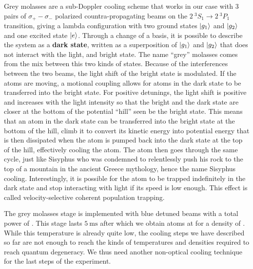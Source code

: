 Grey molasses are a sub-Doppler cooling scheme that works in our case with 3 pairs of $\sigma_{+} - \sigma_{-}$ polarized countra-propagating beams on the $2 \ ^3 S_1 \rightarrow 2 \ ^3 P_1$ transition, giving a lambda configuration with two ground states $\ket{g_1}$ and $\ket{g_2}$ and one excited state $\ket{e}$. Through a change of a basis, it is possible to describe the system as a \textbf{dark state}, written as a superposition of $\ket{g_1}$ and $\ket{g_2}$ that does not interact with the light, and bright state. The name ``grey'' molasses comes from the mix between this two kinds of states. Because of the interferences between the two beams, the light shift of the bright state is modulated. If the atoms are moving, a motional coupling allows for atoms in the dark state to be transferred into the bright state. For positive detunings, the light shift is positive and increases with the light intensity so that the bright and the dark state are closer at the bottom of the potential ``hill'' seen be the bright state. This means that an atom in the dark state can be transferred into the bright state at the bottom of the hill, climb it to convert its kinetic energy into potential energy that is then dissipated when the atom is pumped back into the dark state at the top of the hill, effectively cooling the atom. The atom then goes through the same cycle, just like Sisyphus who was condemned to relentlessly push his rock to the top of a mountain in the ancient Greece mythology, hence the name Sisyphus cooling. Interestingly, it is possible for the atom to be trapped indefinitely in the dark state and stop interacting with light if its speed is low enough. This effect is called velocity-selective coherent population trapping.  

The grey molasses stage is implemented with blue detuned  beams with a total power of . This stage lasts $5 \ \mathrm{ms}$ after which we obtain  atoms at  for a density of . While this temperature is already quite low, the cooling steps we have described so far are not enough to reach the kinds of temperatures and densities required to reach quantum degeneracy. We thus need another non-optical cooling technique for the last steps of the experiment.

